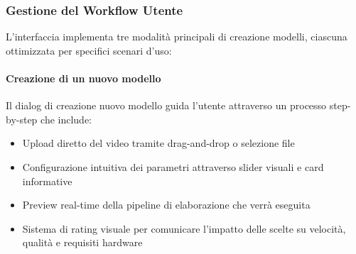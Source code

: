 \subsubsection{Gestione del Workflow Utente}

L'interfaccia implementa tre modalità principali di creazione modelli, ciascuna ottimizzata per specifici scenari d'uso:

\paragraph{Creazione di un nuovo modello}
Il dialog di creazione nuovo modello guida l'utente attraverso un processo step-by-step che include:
\begin{itemize}
	\item Upload diretto del video tramite drag-and-drop o selezione file
	\item Configurazione intuitiva dei parametri attraverso slider visuali e card informative
	\item Preview real-time della pipeline di elaborazione che verrà eseguita
	\item Sistema di rating visuale per comunicare l'impatto delle scelte su velocità, qualità e requisiti hardware
\end{itemize}

